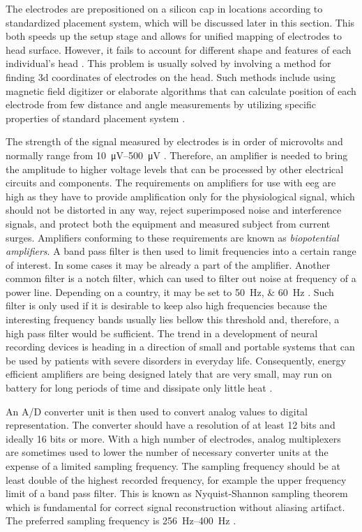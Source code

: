 The electrodes are prepositioned on a silicon cap in locations according to
standardized placement system, which will be discussed later in this section.
This both speeds up the setup stage and allows for unified mapping of electrodes
to head surface. However, it fails to account for different shape and features of each
individual's head \cite{eegFund}. This problem is usually solved by involving a
method for finding \gls{3d} coordinates of electrodes on the head. Such methods
include using magnetic field digitizer or elaborate algorithms that can
calculate position of each electrode from few distance and angle measurements by
utilizing specific properties of standard placement system \cite{rapidPos}.

The strength of the signal measured by electrodes is in order of microvolts and
normally range from \SIrange{10}{500}{\uV} \cite{neuralAmp}. Therefore, an amplifier is needed to bring the amplitude to higher voltage levels that can be processed
by other electrical circuits and components. The requirements on amplifiers for
use with \gls{eeg} are high as they have to provide amplification only for the physiological
signal, which should not be distorted in any way, reject superimposed noise and
interference signals, and protect both the equipment and measured subject from
current surges. Amplifiers conforming to these requirements are known as
\emph{biopotential amplifiers}. \cite{biopotAmp}
A band pass filter is then used to limit frequencies into a certain range of
interest. In some cases it may be already a part of the amplifier.
Another common filter is a notch filter, which can used to filter out noise
at frequency of a power line. Depending on a country, it may be set to
\SIlist[list-units = single, list-pair-separator = { or }]{50;60}{\Hz}
\cite{deltaCompNREM}. Such filter is only used if it is desirable to keep also
high frequencies because the interesting frequency bands usually lies bellow this
threshold and, therefore, a high pass filter would be sufficient.
The trend in a development of neural recording devices is heading in a direction of
small and portable systems that can be used by patients with severe disorders in everyday life.
Consequently, energy efficient amplifiers are being designed lately that are very small, may run on battery for
long periods of time and dissipate only little heat \cite{neuralAmp}.

An A/D converter unit is then used to convert analog values to digital
representation. The converter should have a resolution of at least 12 bits and
ideally 16 bits or more. With a high number of electrodes, analog multiplexers are
sometimes used to lower the number of necessary converter units at the expense
of a limited sampling frequency. The sampling frequency should be at least double of
the highest recorded frequency, for example the upper frequency limit of a
band pass filter. This is known as Nyquist-Shannon sampling theorem which is
fundamental for correct signal reconstruction without aliasing artifact. The
preferred sampling frequency is \SIrange{256}{400}{\Hz} \cite{guidDigEEG}.

